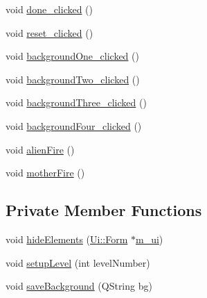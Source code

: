\begin{DoxyCompactItemize}
\item 
void \hyperlink{class_form_abcca43186cdcf3a8f65576b1f7581eea}{done\_\-clicked} ()
\item 
void \hyperlink{class_form_a642d6b971b9ea8e9e1b96c88426ca6f8}{reset\_\-clicked} ()
\item 
void \hyperlink{class_form_a5cdef71302be379ec9c2e2fc037f9f2f}{backgroundOne\_\-clicked} ()
\item 
void \hyperlink{class_form_a8344660630a52616f758765097813580}{backgroundTwo\_\-clicked} ()
\item 
void \hyperlink{class_form_ade0ebe9daab69d9c6cdd2928fb8ce122}{backgroundThree\_\-clicked} ()
\item 
void \hyperlink{class_form_af599736098aa8117bb52b18f7a661091}{backgroundFour\_\-clicked} ()
\item 
void \hyperlink{class_form_ad699933c3ec2a35b96d9b0eb55c18c14}{alienFire} ()
\item 
void \hyperlink{class_form_a9b89dc517d820fdcf314068b40431c77}{motherFire} ()
\end{DoxyCompactItemize}
\subsection*{Private Member Functions}
\begin{DoxyCompactItemize}
\item 
void \hyperlink{class_form_ad6c4fa1f020d41dfbd8cda84c1d00ecb}{hideElements} (\hyperlink{class_ui_1_1_form}{Ui::Form} $\ast$\hyperlink{class_form_a719f9ac1c34536d610446a2a8f65656c}{m\_\-ui})
\item 
void \hyperlink{class_form_add0aafd8f5b0dd308b526cefb5d13367}{setupLevel} (int levelNumber)
\item 
void \hyperlink{class_form_ae852329bf7940d71cf722e412f40b867}{saveBackground} (QString bg)
\end{DoxyCompactItemize}
